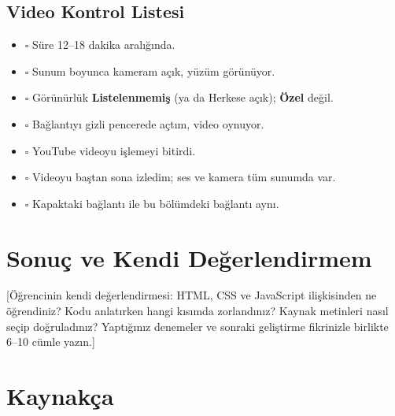 \documentclass[12pt,a4paper]{article}
\begin{document}
\subsection{Video Kontrol Listesi}

\begin{itemize}[label={}]
  \item $\square$ Süre 12--18 dakika aralığında.
  \item $\square$ Sunum boyunca kameram açık, yüzüm görünüyor.
  \item $\square$ Görünürlük \textbf{Listelenmemiş} (ya da Herkese açık); \textbf{Özel} değil.
  \item $\square$ Bağlantıyı gizli pencerede açtım, video oynuyor.
  \item $\square$ YouTube videoyu işlemeyi bitirdi.
  \item $\square$ Videoyu baştan sona izledim; ses ve kamera tüm sunumda var.
  \item $\square$ Kapaktaki bağlantı ile bu bölümdeki bağlantı aynı.
\end{itemize}

\section{Sonuç ve Kendi Değerlendirmem}


[Öğrencinin kendi değerlendirmesi: HTML, CSS ve JavaScript ilişkisinden ne
öğrendiniz? Kodu anlatırken hangi kısımda zorlandınız? Kaynak metinleri nasıl seçip
doğruladınız? Yaptığınız denemeler ve sonraki geliştirme fikrinizle birlikte
6--10 cümle yazın.]

\section{Kaynakça}
\end{document}
